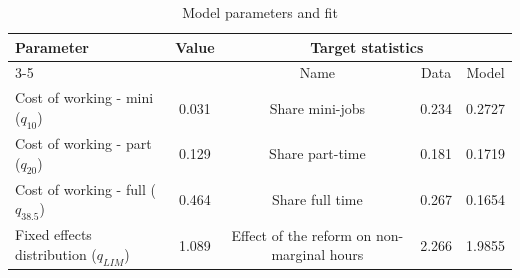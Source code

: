 \begin{table}[htbp]\centering\caption{Model parameters and fit}\label{table:model_param}\footnotesize\begin{tabular}{lcccc} \toprule  Parameter & Value & \multicolumn{3}{c}{Target statistics}  \\\cline{3-5}  &  &  Name & Data & Model  \\\midrule    Cost of working - mini ($q_{10}$)   &0.031& Share mini-jobs           & 0.234 &0.2727\\ Cost of working - part ($q_{20}$)   &0.129& Share part-time           & 0.181 &0.1719\\ Cost of working - full ($q_{38.5}$)      &0.464& Share full time      & 0.267 &0.1654\\ Fixed effects distribution ($q_{LIM}$)    &1.089& Effect of the reform on non-marginal hours  & 2.266& 1.9855\\  \bottomrule\end{tabular}\end{table}